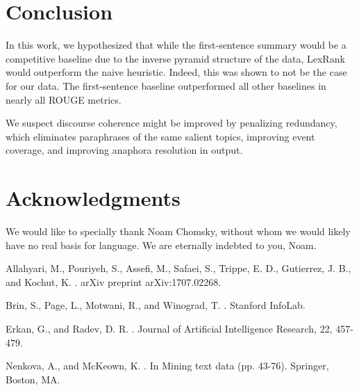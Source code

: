 \documentclass[11pt]{article}
\begin{document}
\section{Conclusion}
\label{sec:length}

In this work, we hypothesized that while the first-sentence summary would be a competitive baseline due to the inverse pyramid structure of the data, LexRank would outperform the naive heuristic. Indeed, this was shown to not be the case for our data. The first-sentence baseline outperformed all other baselines in nearly all ROUGE metrics.

We suspect discourse coherence might be improved by penalizing redundancy, which eliminates paraphrases of the same salient topics, improving event coverage, and improving anaphora resolution in output. 


\section*{Acknowledgments}

We would like to specially thank Noam Chomsky, without whom we would likely have no real basis for language. We are eternally indebted to you, Noam.

%
%

\begin{thebibliography}{}
Allahyari, M., Pouriyeh, S., Assefi, M., Safaei, S., Trippe, E. D., Gutierrez, J. B., and Kochut, K.
.
\newblock arXiv preprint arXiv:1707.02268.

Brin, S., Page, L., Motwani, R., and Winograd, T.
.
\newblock Stanford InfoLab.

Erkan, G., and Radev, D. R.
.
\newblock Journal of Artificial Intelligence Research, 22, 457-479.

Nenkova, A., and McKeown, K.
.
\newblock In Mining text data (pp. 43-76). Springer, Boston, MA.


\end{thebibliography}
\end{document}
